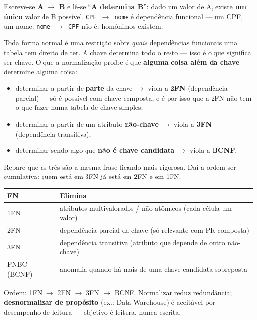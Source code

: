 \begin{conceito}
Escreve-se \textbf{A $\to$ B} e lê-se ``\textbf{A determina B}'': dado um
valor de A, existe \textbf{um único} valor de B possível. \texttt{CPF $\to$
nome} é dependência funcional --- um CPF, um nome. \texttt{nome $\to$ CPF} não
é: homônimos existem.

Toda forma normal é uma restrição sobre \emph{quais} dependências funcionais
uma tabela tem direito de ter. A chave determina todo o resto --- isso é o que
significa ser chave. O que a normalização proíbe é que \textbf{alguma coisa
além da chave} determine alguma coisa:

\begin{itemize}
\item determinar a partir de \textbf{parte} da chave $\to$ viola a
\textbf{2FN} (dependência parcial) --- só é possível com chave composta, e é
por isso que a 2FN não tem o que fazer numa tabela de chave simples;
\item determinar a partir de um atributo \textbf{não-chave} $\to$ viola a
\textbf{3FN} (dependência transitiva);
\item determinar sendo algo que \textbf{não é chave candidata} $\to$ viola a
\textbf{BCNF}.
\end{itemize}

Repare que as três são a mesma frase ficando mais rigorosa. Daí a ordem ser
cumulativa: quem está em 3FN já está em 2FN e em 1FN.
\end{conceito}

\begin{center}
\begin{tabular}{@{}p{2cm}p{9.4cm}@{}}
\toprule
\textbf{FN} & \textbf{Elimina} \\
\midrule
1FN & atributos multivalorados / não atômicos (cada célula um valor) \\
2FN & dependência parcial da chave (só relevante com PK composta) \\
3FN & dependência transitiva (atributo que depende de outro não-chave) \\
FNBC (BCNF) & anomalia quando há mais de uma chave candidata sobreposta \\
\bottomrule
\end{tabular}
\end{center}

Ordem: 1FN $\to$ 2FN $\to$ 3FN $\to$ BCNF. Normalizar reduz redundância;
\textbf{desnormalizar de propósito} (ex.: Data Warehouse) é aceitável por
desempenho de leitura --- objetivo é leitura, nunca escrita.


